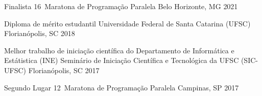 


\begin{cvhonors}

  \cvhonor
    {Finalista} %
    {16\textordmasculine~Maratona de Programação Paralela} %
    {Belo Horizonte, MG} %
    {2021} %

  \cvhonor
    {Diploma de mérito estudantil} %
    {Universidade Federal de Santa Catarina (UFSC)} %
    {Florianópolis, SC} %
    {2018} %

  \cvhonor
    {Melhor trabalho de iniciação científica do Departamento de Informática e Estátistica (INE)} %
    {Seminário de Iniciação Científica e Tecnológica da UFSC (SIC-UFSC)} %
    {Florianópolis, SC} %
    {2017} %

  \cvhonor
    {Segundo Lugar} %
    {12\textordmasculine~Maratona de Programação Paralela} %
    {Campinas, SP} %
    {2017} %


\end{cvhonors}
